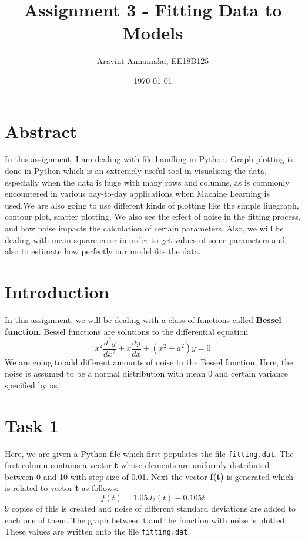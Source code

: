 \documentclass[11pt, a4paper]{article}
\title{Assignment 3 - Fitting Data to Models}
\author{Aravint Annamalai, EE18B125}
\date{\today}
\begin{document}
\maketitle

\section{Abstract}
In this assignment, I am dealing with file handling in Python. Graph plotting is done in Python which is an extremely useful tool in visualising the data, especially when the data is huge with many rows and columns, as is commonly encountered in various day-to-day applications when Machine Learning is used.We are also going to use different kinds of plotting like the simple linegraph, contour plot, scatter plotting. We also see the effect of noise in the fitting process, and how noise impacts the calculation of certain parameters. Also, we will be dealing with mean square error in order to get values of some parameters and also to estimate how perfectly our model fits the data.

\section{Introduction}
In this assignment, we will be dealing with a class of functions called \textbf{Bessel function}.  Bessel functions are solutions to the differential equation
\begin{equation*}
x^2\frac{d^2y}{dx^2} + x\frac{dy}{dx} + (x^2 + a^2)y = 0
\end{equation*}
We are going to add different amounts of noise to the Bessel function. Here, the noise is assumed to be a normal distribution with mean 0 and certain variance specified by us. 

\section{Task 1}
Here, we are given a Python file which first populates the file \texttt{fitting.dat}. The first column contains a vector \textbf{t} whose elements are uniformly distributed between 0 and 10 with step size of 0.01. Next the vector \textbf{f(t)} is generated which is related to vector \textbf{t} as follows:
\begin{equation}\label{eq:1}
f(t) = 1.05J_2(t) - 0.105t
\end{equation}
9 copies of this is created and noise of different standard deviations are added to each one of them. The graph between t and the function with noise is plotted. These values are written onto the file \texttt{fitting.dat}.
\end{document}
